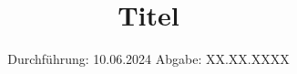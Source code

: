 

\subject{Versuch V47}
\title{Titel}
\date{%
  Durchführung: 10.06.2024
  \hspace{3em}
  Abgabe: XX.XX.XXXX
}



\maketitle
\thispagestyle{empty}
\tableofcontents
\newpage






\nocite{*}
\printbibliography



